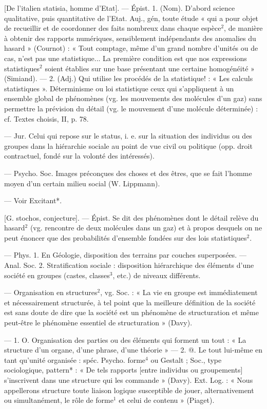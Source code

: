 \begin{itemize}[leftmargin=1cm, label=, itemsep=1pt]
 [De l'italien statisia, homme
d'Etat]. — Épist. 1. (Nom). D'abord
science qualitative, puis quantitative de l'Etat. Auj., gén, toute
étude « qui a pour objet de recueillir
et de coordonner des faits nombreux dans chaque espèce$^2$, de manière à obtenir des rapports numériques, sensiblement indépendants
des anomalies du hasard » (Cournot) :
« Tout comptage, même d’un grand
nombre d'unités ou de cas, n’est pas
une statistique... La première condition est que nos expressions statistiques$^2$ soient établies sur une base
présentant une certaine homogénéité » (Simiand). — 2. (Adj.) Qui
utilise les procédés de la statistique! : « Les calculs statistiques ».
Déterminisme ou loi statistique
ceux qui s'appliquent à un ensemble
global de phénomènes (vg. les mouvements des molécules d’un gaz)
sans permettre la prévision du détail
(vg. le mouvement d’une molécule
déterminée) : cf. Textes choisis, II,
p. 78.

 — Jur. Celui qui
repose sur le status, i. e. sur la situation des individus ou des groupes
dans la hiérarchie sociale au point
de vue civil ou politique (opp. droit
contractuel, fondé sur la volonté
des intéressés).

 — Psycho. Soc. Images
préconçues des choses et des êtres,
que se fait l'homme moyen d’un
certain milieu social (W. Lippmann).

 — Voir Excitant*.

 [G. stochos,  conjecture]. — Épist. Se dit des phénomènes
dont le détail relève du
hasard$^2$ (vg. rencontre de deux molécules dans un gaz) et à propos desquels on ne peut énoncer que des
probabilités d'ensemble fondées sur
des lois statistiques$^2$.

 — Phys. 1. En Géologie,
disposition des terrains par couches
superposées. — Anal. Soc. 2. Stratification sociale : disposition hiérarchique
des éléments d’une société en groupes
(castes, classes$^3$, etc.) de niveaux
différents.

 — Organisation en
structures$^2$, vg. Soc. : « La vie en
groupe est immédiatement et nécessairement structurée, à tel point
que la meilleure définition de la
société est sans doute de dire que la
société est un phénomène de structuration et même peut-être le phénomène essentiel de structuration »
(Davy).

 — 1. O. Organisation des parties ou des éléments qui forment un
tout : « La structure d’un organe,
d'une phrase, d’une théorie » —
2. @. Le tout lui-même en tant
qu'unité organisée : spéc. Psycho.
forme$^4$ ou Gestalt ; Soc., type sociologique, pattern* : « De tels rapports
[entre individus ou groupements]
s'inscrivent dans une structure qui
les commande » (Davy). Ext. Log. :
« Nous appellerons structure toute
liaison logique susceptible de jouer,
alternativement ou simultanément,
le rôle de forme$^1$ et celui de contenu »
(Piaget).


\end{itemize}
